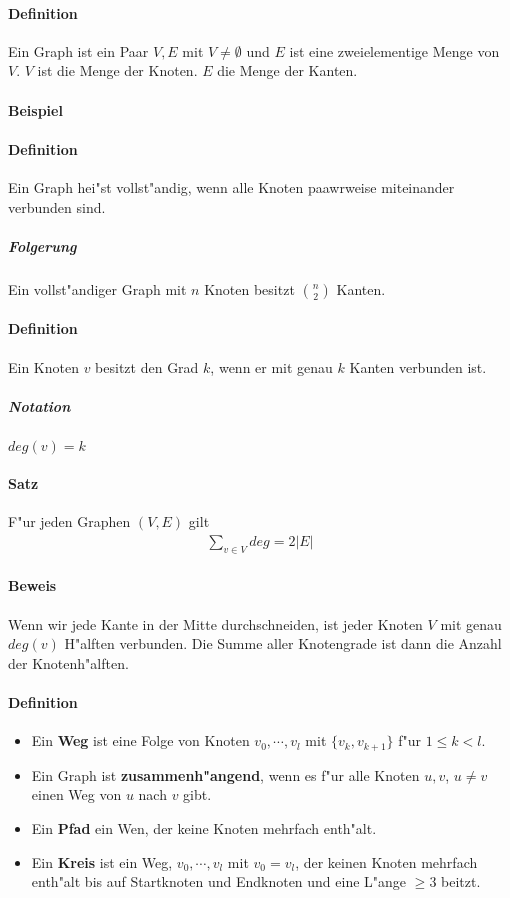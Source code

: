 \paragraph{Definition} \parskp
Ein Graph ist ein Paar $V,E$ mit $V\ne\emptyset$ und $E$ ist eine zweielementige Menge von $V$. $V$ ist die
Menge der Knoten. $E$ die Menge der Kanten.

\paragraph{Beispiel}

\paragraph{Definition} \parskp
Ein Graph hei"st vollst"andig, wenn alle Knoten paawrweise miteinander verbunden sind.
\subparagraph{Folgerung} Ein vollst"andiger Graph mit $n$ Knoten besitzt $\binom{n}{2}$ Kanten.

\paragraph{Definition}  \parskp
Ein Knoten $v$ besitzt den Grad $k$, wenn er mit genau $k$ Kanten verbunden ist.
\subparagraph{Notation} $deg(v)=k$

\paragraph{Satz} F"ur jeden Graphen $(V,E)$ gilt
\begin{align*}
    \sum_{v\in V}deg=2|E|
\end{align*}


\paragraph{Beweis} \parskp
Wenn wir jede Kante in der Mitte durchschneiden, ist jeder Knoten $V$ mit genau $deg(v)$ H"alften verbunden.
Die Summe aller Knotengrade ist dann die Anzahl der Knotenh"alften.

\paragraph{Definition}
\begin{itemize}
    \item Ein \textbf{Weg} ist eine Folge von Knoten $v_0,\cdots,v_l$ mit $\{v_k,v_{k+1}\}$ f"ur $1\le k<l$.
    \item Ein Graph ist \textbf{zusammenh"angend}, wenn es f"ur alle Knoten $u,v$, $u\ne v$ einen Weg von $u$
          nach $v$ gibt.
    \item Ein \textbf{Pfad} ein Wen, der keine Knoten mehrfach enth"alt.
    \item Ein \textbf{Kreis} ist ein Weg, $v_0,\cdots,v_l$ mit $v_0=v_l$, der keinen Knoten mehrfach enth"alt
          bis auf Startknoten und Endknoten und eine L"ange $\ge3$ beitzt.
\end{itemize}

